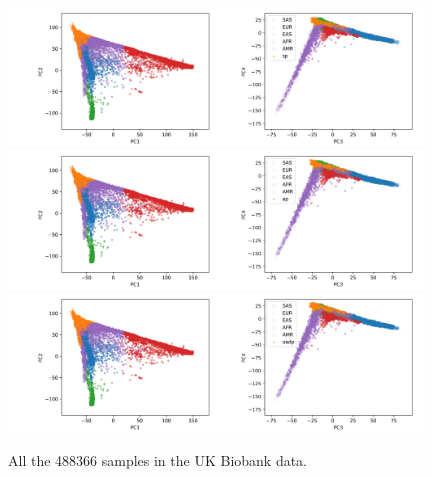 \documentclass{article}
\begin{document}
\begin{figure}[p]
  \centering
  \includegraphics[width=0.98\textwidth]{img/ukb_snpscap_kgn_bial_orphans_nchunks100_sturef_kgn_bial_orphans_snps_ukb_snpscap_ukb_sp.png}
  \includegraphics[width=0.98\textwidth]{img/ukb_snpscap_kgn_bial_orphans_nchunks100_sturef_kgn_bial_orphans_snps_ukb_snpscap_ukb_ap.png}
  \includegraphics[width=0.98\textwidth]{img/ukb_snpscap_kgn_bial_orphans_nchunks100_sturef_kgn_bial_orphans_snps_ukb_snpscap_ukb_oadp.png}
  \caption{All the 488366 samples in the UK Biobank data.}
  \label{fig:ukb}
\end{figure}
\end{document}

